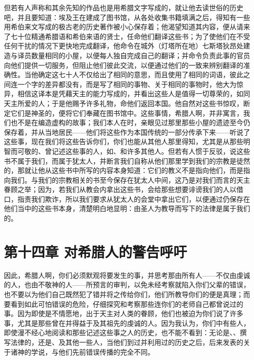 但若有人声称和其余先知的作品也是用希腊文字写成的，就让他去读世俗的历史吧，并且要知道：埃及王在建成了图书馆，从各处收集书籍填满之后，得知有一些用希伯来文写成的极古老的历史著作被小心保存着；他渴望知道其内容，便从请来了七十位精通希腊语和希伯来语的贤士，任命他们翻译这些书；为了使他们在不受任何干扰的情况下更快地完成翻译，他命令在城外（灯塔所在地）七斯塔狄昂处建造与译员数量相同的小屋，以便每人独自完成自己的翻译；并命令负责此事的官员向他们提供一切服务，但阻止他们彼此交流，以便通过他们的一致来辨别翻译的准确性。当他确定这七十人不仅给出了相同的意思，而且使用了相同的词语，彼此之间连一个字的差异都没有，而是写了相同的事物、关于相同的事物时，他大为惊异，相信这译本是凭藉天主的能力写成的，并看出这些人是值得一切尊荣的，如同天主所爱的人；于是他赐予许多礼物，命他们返回本国。他自然对这些书惊叹，断定它们是神圣的，便将它们奉藏在图书馆中。这些事情，希腊人啊，并非寓言，我们也不是在编造虚构的故事；我们本人在时，亲眼见过那里那些小屋的遗迹至今仍保存着，并从当地居民——他们将这些作为本国传统的一部分传承下来——听说了这些事，现在我们将这些告诉你们，你们也能从其他人那里得知，尤其是从那些明智而可敬的、曾记述这些事的人，如、和许多其他人。但若有人惯于反驳，说这些书不属于我们，而属于犹太人，并断言我们自称从他们那里学到我们的宗教是徒然的，那就让他从这些书中所写的内容本身知道：它们的教义不是指向他们，而是指向我们。与我们的宗教相关的书至今保存在犹太人中间，这乃是对我们而言的天主眷顾之举；因为，若我们从教会内拿出这些书，会给那些想要诽谤我们的人以借口，指责我们欺诈，所以我们要求从犹太人的会堂中拿出它们，以便通过仍保存在他们当中的这些书本身，清楚明白地显明：由圣人为教导而写下的法律是属于我们的。\par


\section{第十四章 对希腊人的警告呼吁}

因此，希腊人啊，你们必须默观将要发生的事，并思考那由所有人——不仅由虔诚的人，也由不敬神的人——所预言的审判，以免未经考察就陷入你们父辈的错误，也不要以为他们自己既然犯了错并将之传给你们，他们所教导你们的便是真理；而要看到如此可怕错误的危险，仔细探究和考察那些连你们的老师自己都曾说过的事。因为即使是不情愿地，出于天主对人类的眷顾，他们也被迫为你们说了许多事，尤其是那些曾在并得益于及其祖先的虔诚的人。因为我认为，你们中有些人，即使漫不经心地阅读和那些记述这些事之人的历史，也不能不看到：无论是、、撰写法律的，还是、及其他一些人，当他们到过并利用过的历史之后，后来发表的关于诸神的学说，与他们先前错误传播的完全不同。\par

